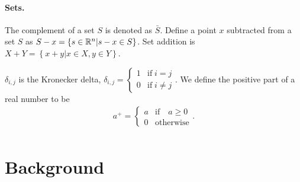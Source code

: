 \documentclass{article}
\begin{document}
\paragraph*{Sets.}
The complement of a set $S$ is denoted as $\bar S$.
Define a point $x$ subtracted from a set $S$ as $S - x = \left\{s \in \mathbb R^n | s - x \in S\right\}$.
Set addition is $X + Y = \left\{x + y | x \in X, y \in Y\right\}$.

$\delta_{i,j}$ is the Kronecker delta, $\delta_{i, j} = \begin{cases} 1 & \textrm{if} \; i = j \\ 0 & \textrm{if} \; i \ne j \end{cases}$.
We define the positive part of a real number to be
\begin{align*}
a^+ = \begin{cases} a & \textrm{if} \quad a \ge 0 \\ 0 & \textrm{otherwise} \end{cases}.\\
\end{align*}



\section{Background}
\end{document}
